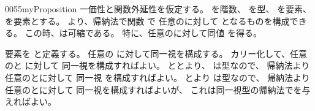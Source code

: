\documentclass[index]{subfiles}
\begin{document}
\begin{myBlock}{0055}{myProposition}
  一価性と関数外延性を仮定する。
  を階数、
  を型、
  を要素、
  を要素とする。
  より、帰納法で関数
  で
  任意のに対して
  となるものを構成できる。
  この時、は可縮である。
  特に、任意のに対して同値
  を得る。
\end{myBlock}
\begin{myProof}
  要素を
  と定義する。
  任意の
  に対して同一視を構成する。
  カリー化して、任意のと
  に対して
  同一視を構成すればよい。
  ととより、
  は型なので、
  帰納法より任意のとに対して
  同一視
  を構成すればよい。
  とより
  は型なので、
  帰納法より任意のとに対して
  同一視を構成すればよいが、
  これは同一視型の帰納法でを与えればよい。
\end{myProof}
\end{document}
